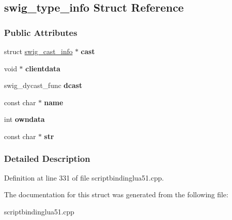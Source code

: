 \hypertarget{structswig__type__info}{
\subsection{swig\_\-type\_\-info Struct Reference}
\label{structswig__type__info}
}
\subsubsection*{Public Attributes}
\begin{DoxyCompactItemize}
\item 
\hypertarget{structswig__type__info_a3ee3f7ef20e965b6c798d79723a96f9b}{
struct \hyperlink{structswig__cast__info}{swig\_\-cast\_\-info} $\ast$ {\bfseries cast}}
\label{structswig__type__info_a3ee3f7ef20e965b6c798d79723a96f9b}

\item 
\hypertarget{structswig__type__info_a19bdd65dceb89cd54befd3ded06558b7}{
void $\ast$ {\bfseries clientdata}}
\label{structswig__type__info_a19bdd65dceb89cd54befd3ded06558b7}

\item 
\hypertarget{structswig__type__info_a07df4bedf85be77b23756b531b60e0dd}{
swig\_\-dycast\_\-func {\bfseries dcast}}
\label{structswig__type__info_a07df4bedf85be77b23756b531b60e0dd}

\item 
\hypertarget{structswig__type__info_a90a9c6a25aa3e923978005ecbe23ad60}{
const char $\ast$ {\bfseries name}}
\label{structswig__type__info_a90a9c6a25aa3e923978005ecbe23ad60}

\item 
\hypertarget{structswig__type__info_a93c25d5903cbfcb82208eea7227c32bd}{
int {\bfseries owndata}}
\label{structswig__type__info_a93c25d5903cbfcb82208eea7227c32bd}

\item 
\hypertarget{structswig__type__info_abbe7cc58a083feb4329b748643324064}{
const char $\ast$ {\bfseries str}}
\label{structswig__type__info_abbe7cc58a083feb4329b748643324064}

\end{DoxyCompactItemize}


\subsubsection{Detailed Description}


Definition at line 331 of file scriptbindinglua51.cpp.



The documentation for this struct was generated from the following file:\begin{DoxyCompactItemize}
\item 
scriptbindinglua51.cpp\end{DoxyCompactItemize}
